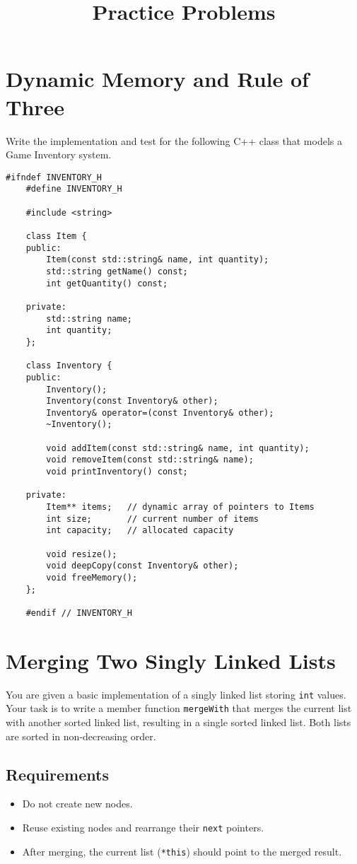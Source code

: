 \documentclass{article}
\title{Practice Problems}
\author{}
\date{}
\begin{document}
\maketitle
\section{Dynamic Memory and Rule of Three}
Write the implementation and test for the following C++ class that models a Game Inventory system.
\begin{lstlisting}[style=cppstyle]
	#ifndef INVENTORY_H
	#define INVENTORY_H
	
	#include <string>
	
	class Item {
	public:
		Item(const std::string& name, int quantity);
		std::string getName() const;
		int getQuantity() const;
	
	private:
		std::string name; 
		int quantity;
	};
	
	class Inventory {
	public:
		Inventory();
		Inventory(const Inventory& other);
		Inventory& operator=(const Inventory& other);
		~Inventory();
	
		void addItem(const std::string& name, int quantity);
		void removeItem(const std::string& name);
		void printInventory() const;
	
	private:
		Item** items;   // dynamic array of pointers to Items
		int size;       // current number of items
		int capacity;   // allocated capacity
	
		void resize();
		void deepCopy(const Inventory& other);
		void freeMemory();
	};
	
	#endif // INVENTORY_H
\end{lstlisting}


\section{Merging Two Singly Linked Lists}

You are given a basic implementation of a singly linked list storing \texttt{int} values. Your task is to write a member function \texttt{mergeWith} that merges the current list with another sorted linked list, resulting in a single sorted linked list. Both lists are sorted in non-decreasing order.

\subsection*{Requirements}
\begin{itemize}
  \item Do not create new nodes.
  \item Reuse existing nodes and rearrange their \texttt{next} pointers.
  \item After merging, the current list (\texttt{*this}) should point to the merged result.
\end{itemize}
\end{document}
